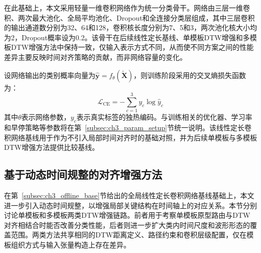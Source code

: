 \documentclass{xdupgthesis}
\begin{document}
在此基础上，本文采用轻量一维卷积网络作为统一分类骨干。网络由三层一维卷积、两次最大池化、全局平均池化、Dropout和全连接分类层组成，其中三层卷积的输出通道数分别为32、64和128，卷积核长度分别为7、5和3，两次池化核大小均为2，Dropout概率设为0.2。该骨干在后续线性定长基线、单模板DTW增强和多模板DTW增强方法中保持一致，仅输入表示方式不同，从而使不同方案之间的性能差异主要反映时间对齐策略的贡献，而非网络容量的变化。

设网络输出的类别概率向量为$\hat{\mathbf{y}}=f_{\theta}(\tilde{\mathbf{X}})$，则训练阶段采用的交叉熵损失函数为：
\begin{equation}
    \mathcal{L}_{\mathrm{CE}}=-\sum_{c=1}^{3} y_c \log \hat{y}_c
\end{equation}
其中$\theta$表示网络参数，$y_c$表示真实标签的独热编码。与训练相关的优化器、学习率和早停策略等参数将在第~\ref{subsec:ch3_param_setup}节统一说明。该线性定长卷积网络基线用于作为不引入局部时间对齐时的基础对照，并为后续单模板与多模板DTW增强方法提供比较基线。

\subsection{基于动态时间规整的对齐增强方法}
\label{subsec:ch3_dtw_def}

在第~\ref{subsec:ch3_offline_base}节给出的全局线性定长卷积网络基线基础上，本文进一步引入动态时间规整，以增强局部关键结构在时间轴上的对应关系\cite{ch3_sakoe1978dtw}。本节分别讨论单模板和多模板两类DTW增强链路。前者用于考察单模板原型路由与DTW对齐相结合时能否改善分类性能，后者则进一步扩大类内时间尺度和波形形态的覆盖范围。两类方法共享相同的DTW距离定义、路径约束和卷积层级配置，仅在模板组织方式与输入张量构造上存在差异。
\end{document}
